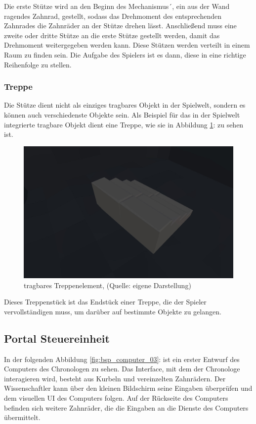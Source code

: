 Die erste Stütze wird an den Beginn des Mechanismus´, ein aus der Wand ragendes Zahnrad, gestellt, sodass das Drehmoment des entsprechenden Zahnrades die Zahnräder an der Stütze drehen lässt. Anschließend muss eine zweite oder dritte Stütze an die erste Stütze gestellt werden, damit das Drehmoment weitergegeben werden kann. Diese Stützen werden verteilt in einem Raum zu finden sein. Die Aufgabe des Spielers ist es dann, diese in eine richtige Reihenfolge zu stellen.

\subsubsection{Treppe}
Die Stütze dient nicht als einziges tragbares Objekt in der Spielwelt, sondern es können auch verschiedenste Objekte sein. Als Beispiel für das in der Spielwelt integrierte tragbare Objekt dient eine Treppe, wie sie in Abbildung \ref{fig:stairs}:  zu sehen ist.

\begin{figure}[ht]
\centering
\includegraphics[width=0.8\linewidth]{content/pictures/Stairs.jpg}
\caption{tragbares Treppenelement, (Quelle: eigene Darstellung)}
\label{fig:stairs}
\end{figure}

Dieses Treppenstück ist das Endstück einer Treppe, die der Spieler vervollständigen muss, um darüber auf bestimmte Objekte zu gelangen.

\subsection{Portal Steuereinheit}\label{sec:portal}
In der folgenden Abbildung \ref{fig:bsp_computer_03}:  ist ein erster Entwurf des Computers des Chronologen zu sehen. Das Interface, mit dem der Chronologe interagieren wird, besteht aus Kurbeln und vereinzelten Zahnrädern. Der Wissenschaftler kann über den kleinen Bildschirm seine Eingaben überprüfen und dem visuellen \ac{UI} des Computers folgen. Auf der Rückseite des Computers befinden sich weitere Zahnräder, die die Eingaben an die Dienste des Computers übermittelt. 

